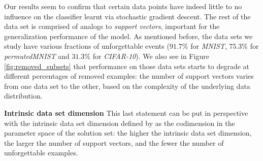 Our results seem to confirm that certain data points have indeed little to no influence on the classifier learnt via stochastic gradient descent. The rest of the data set is comprised of analogs to \textit{support vectors}, important for the generalization performance of the model. As mentioned before, the data sets we study have various fractions of unforgettable events ($91.7\%$ for \emph{MNIST}, $75.3\%$ for \emph{permutedMNIST} and  $31.3\%$ for \emph{CIFAR-10}). We also see in Figure \ref{fig:removed_subsets} that performance on those data sets starts to degrade at different percentages of removed examples: the number of support vectors varies from one data set to the other, based on the complexity of the underlying data distribution.

\textbf{Intrinsic data set dimension} This last statement can be put in perspective with the intrinsic data set dimension defined by \citet{intrinsic} as the codimension in the parameter space of the solution set: the higher the intrinsic data set dimension, the larger the number of support vectors, and the fewer the number of unforgettable examples.


